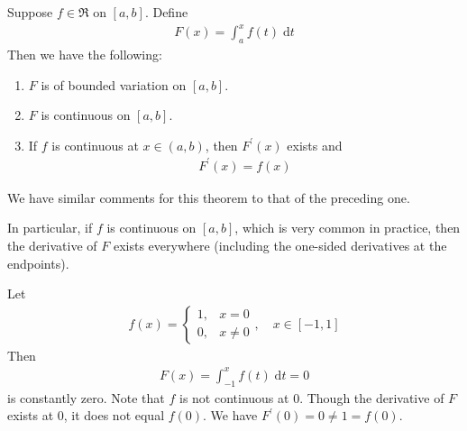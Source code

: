 \documentclass[thmcnt=section, 12pt]{my-elegantbook}
\begin{document}
\begin{theorem} \label{thm:81}
	Suppose $f \in \mathfrak{R}$ on $[a, b]$.
	Define
	\begin{align*}
		F(x) = \int_a^x f(t) \; \mathrm{d} t
	\end{align*}
	Then we have the following:
	\begin{enumerate}
		\item $F$ is of bounded variation on $[a, b]$.
		\item $F$ is continuous on $[a, b]$.
		\item If $f$ is continuous at $x \in (a, b)$, 
			then $F^\prime(x)$ exists and
			\begin{align*}
				F^\prime(x) = f(x)
			\end{align*}
	\end{enumerate}
\end{theorem}

\begin{note}
	We have similar comments for this theorem
	to that of the preceding one.

	In particular, if $f$ is continuous on $[a, b]$,
	which is very common in practice,
	then the derivative of $F$ exists everywhere
	(including the one-sided derivatives at the endpoints).
\end{note}

\begin{example} \label{eg:13}
	Let 
	\begin{align*}
		f(x) = \begin{cases}
			1,
			&x = 0 \\ 
			0,
			&x \neq 0 
		\end{cases},
		\quad x \in [-1, 1]
	\end{align*}
	Then 
	\begin{align*}
		F(x)
		= \int_{-1}^x f(t) \; \mathrm{d} t
		= 0 
	\end{align*}
	is constantly zero. 
	Note that $f$ is not continuous at $0$.
	Though the derivative of $F$ exists at $0$, 
	it does not equal $f(0)$. 
	We have $F^\prime(0) = 0 \neq 1 = f(0)$.
\end{example}
\end{document}
